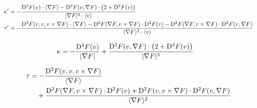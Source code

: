\begin{subequations}    
    \begin{align}
        \kappa'   &=
        - \frac{ \mathrm{D}^{  3  } F ( v ) \cdot \langle  \nabla F   \rangle  -
        \mathrm{D}^{  2  } F ( v, \nabla F  ) \cdot
        \left( 2  +  \mathrm{D}^{  2  } F ( v ) \right) }{
        \lvert  \nabla F   \rvert^3 \cdot \langle  v  \rangle }   \\
        \tau'   &=
        - \frac{ \mathrm{D}^{  3  } F ( v, v, v \times \nabla F  ) \cdot \langle  \nabla F   \rangle  -
        \mathrm{D}^{  2  } F ( \nabla F , v \times \nabla F  ) \cdot \mathrm{D}^{  2  } F ( v )  -
        \mathrm{D}^{  2  } F ( \nabla F , v \times \nabla F  ) \cdot \mathrm{D}^{  2  } F ( v, \nabla F  )
        }{ \langle  \nabla F   \rangle^2 \cdot \langle  v  \rangle }
    \end{align}
\end{subequations}


\begin{align}
    \kappa   &=
    - \frac{ \mathrm{D}^{ 3 }F( v ) }{ \lvert  \nabla F  \rvert }  +
    \frac{ \mathrm{D}^{ 2 }F( v, \nabla F ) \cdot \left( 2 + \mathrm{D}^{ 2 }F( v ) \right) }{
    \lvert  \nabla F  \rvert^3 }
\end{align}

\begin{subequations}
    \begin{align}
        \tau   &=
        - \frac{ \mathrm{D}^{ 2 }F( v, v, v \times \nabla F ) }{ \langle  \nabla F  \rangle }  \\
        &\quad+  \frac{ \mathrm{D}^{ 2 }F( \nabla F, v \times \nabla F ) \cdot \mathrm{D}^{ 2 }F( v )  +
        \mathrm{D}^{ 2 }F( v, v \times \nabla F ) \cdot \mathrm{D}^{ 2 }F( v, \nabla F ) }{
        \langle  \nabla F  \rangle^2 }
    \end{align}
\end{subequations}